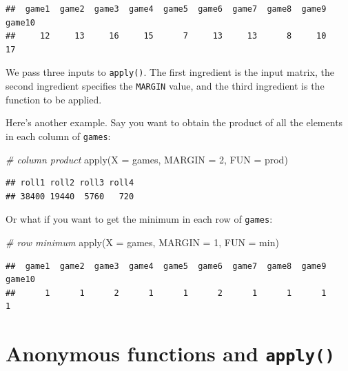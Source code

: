 \documentclass[
]{book}
\newenvironment{Shaded}{\begin{snugshade}}{\end{snugshade}}
\newcommand{\AttributeTok}[1]{\textcolor[rgb]{0.77,0.63,0.00}{#1}}
\newcommand{\CommentTok}[1]{\textcolor[rgb]{0.56,0.35,0.01}{\textit{#1}}}
\newcommand{\DecValTok}[1]{\textcolor[rgb]{0.00,0.00,0.81}{#1}}
\newcommand{\FunctionTok}[1]{\textcolor[rgb]{0.00,0.00,0.00}{#1}}
\newcommand{\NormalTok}[1]{#1}
\begin{document}
\begin{verbatim}
##  game1  game2  game3  game4  game5  game6  game7  game8  game9 game10 
##     12     13     16     15      7     13     13      8     10     17
\end{verbatim}

We pass three inputs to \texttt{apply()}. The first ingredient is the input matrix,
the second ingredient specifies the \texttt{MARGIN} value, and the third ingredient
is the function to be applied.

Here's another example. Say you want to obtain the product of all the elements
in each column of \texttt{games}:

\begin{Shaded}
\begin{Highlighting}[]
\CommentTok{\# column product}
\FunctionTok{apply}\NormalTok{(}\AttributeTok{X =}\NormalTok{ games, }\AttributeTok{MARGIN =} \DecValTok{2}\NormalTok{, }\AttributeTok{FUN =}\NormalTok{ prod)}
\end{Highlighting}
\end{Shaded}

\begin{verbatim}
## roll1 roll2 roll3 roll4 
## 38400 19440  5760   720
\end{verbatim}

Or what if you want to get the minimum in each row of \texttt{games}:

\begin{Shaded}
\begin{Highlighting}[]
\CommentTok{\# row minimum}
\FunctionTok{apply}\NormalTok{(}\AttributeTok{X =}\NormalTok{ games, }\AttributeTok{MARGIN =} \DecValTok{1}\NormalTok{, }\AttributeTok{FUN =}\NormalTok{ min)}
\end{Highlighting}
\end{Shaded}

\begin{verbatim}
##  game1  game2  game3  game4  game5  game6  game7  game8  game9 game10 
##      1      1      2      1      1      2      1      1      1      1
\end{verbatim}

\hypertarget{anonymous-functions-and-apply}{%
\section{\texorpdfstring{Anonymous functions and \texttt{apply()}}{Anonymous functions and apply()}}\label{anonymous-functions-and-apply}}
\end{document}
